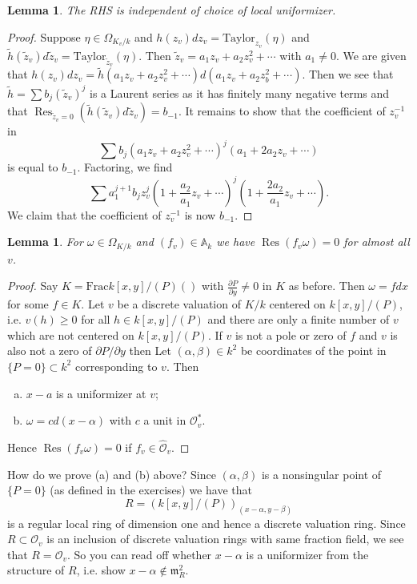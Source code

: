 \documentclass{article}
\newcommand{\fr}{\mathfrak}
\DeclareMathOperator{\res}{Res}
\theoremstyle{plain}
\newtheorem{lem}[thm]{Lemma}
\theoremstyle{definition}
\theoremstyle{remark}
\begin{document}
\begin{lem}
\label{L97}
The RHS is independent of choice of local uniformizer.
\end{lem}
\begin{proof}
Suppose $\eta\in\Omega_{K_v/k}$ and $h(z_v)dz_v=\text{Taylor}_{z_v}(\eta)$ and $\tilde h(\tilde z_v)d\tilde z_v=\text{Taylor}_{\tilde z_v}(\eta)$.
Then $\tilde z_v=a_1z_v+a_2z_v^2+\cdots$ with $a_1\neq 0$. We are given that $h(z_v)dz_v=\tilde h(a_1z_v+a_2z_v^2+\cdots)d(a_1z_v+a_2z_b^2+\cdots)$. Then we see that $\tilde h=\sum b_j(\tilde z_v)^j$ is a Laurent series as it has finitely many negative terms and that $\res_{\tilde z_v=0}\left(\tilde h(\tilde z_v)d\tilde z_v\right)=b_{-1}$. It remains to show that the coefficient of $z_v^{-1}$ in
\[\sum b_j(a_1z_v+a_2z_v^2+\cdots)^j(a_1+2a_2z_v+\cdots)\]
is equal to $b_{-1}$. Factoring, we find
\[\sum a_1^{j+1}b_jz_v^j\left(1+\frac{a_2}{a_1}z_v+\cdots\right)^j\left(1+\frac{2a_2}{a_1}z_v+\cdots\right).\]
We claim that the coefficient of $z_v^{-1}$ is now $b_{-1}$.
\end{proof}

\begin{lem}
\label{L98}
For $\omega\in\Omega_{K/k}$ and $(f_v)\in\mathbb{A}_k$ we have $\res(f_v\omega)=0$ for almost all $v$.
\end{lem}
\begin{proof}
Say $K=\text{Frac}k[x,y]/(P)\left(\right)$ with $\frac{\partial P}{\partial y}\neq 0$ in $K$ as before. Then $\omega=fdx$ for some $f\in K$. Let $v$ be a discrete valuation of $K/k$ centered on $k[x,y]/(P)$, i.e. $v(h)\geq 0$ for all $h\in k[x,y]/(P)$ and there are only a finite number of $v$ which are not centered on $k[x,y]/(P)$. If $v$ is not a pole or zero of $f$ and $v$ is also not a zero of $\partial P/\partial y$ then 
Let $(\alpha,\beta)\in k^2$ be coordinates of the point in $\{P=0\}\subset k^2$ corresponding to $v$. Then
\begin{enumerate}[(a)]
\item $x-a$ is a uniformizer at $v$;
\item $\omega=cd(x-\alpha)$ with $c$ a unit in $\mathcal{O}_v^*$.
\end{enumerate}
Hence $\res(f_v\omega)=0$ if $f_v\in\hat{\mathcal{O}}_v$.
\end{proof}

How do we prove (a) and (b) above? Since $(\alpha,\beta)$ is a nonsingular point of $\{P=0\}$ (as defined in the exercises) we have that
\[R=\left(k[x,y]/(P)\right)_{(x-\alpha,y-\beta)}\]
is a regular local ring of dimension one and hence a discrete valuation ring. Since $R\subset\mathcal{O}_v$ is an inclusion of discrete valuation rings with same fraction field, we see that $R=\mathcal{O}_v$. So you can read off whether $x-\alpha$ is a uniformizer from the structure of $R$, i.e. show $x-\alpha\notin \fr m_{R}^2$.
\end{document}
